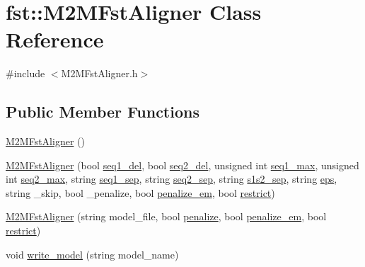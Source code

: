 \hypertarget{classfst_1_1_m2_m_fst_aligner}{}\section{fst\+:\+:M2\+M\+Fst\+Aligner Class Reference}
\label{classfst_1_1_m2_m_fst_aligner}


{\ttfamily \#include $<$M2\+M\+Fst\+Aligner.\+h$>$}

\subsection*{Public Member Functions}
\begin{DoxyCompactItemize}
\item 
\hyperlink{classfst_1_1_m2_m_fst_aligner_a914c39c27f3467848d3034a42d5d7fca}{M2\+M\+Fst\+Aligner} ()
\item 
\hyperlink{classfst_1_1_m2_m_fst_aligner_ae23113e5cae29dc94b32ed9579d55c25}{M2\+M\+Fst\+Aligner} (bool \hyperlink{classfst_1_1_m2_m_fst_aligner_a1ea4cfa480a906720412d89e3cbdf78f}{seq1\+\_\+del}, bool \hyperlink{classfst_1_1_m2_m_fst_aligner_a5aaa4b5b87e92d8060aa23f28e9219e6}{seq2\+\_\+del}, unsigned int \hyperlink{classfst_1_1_m2_m_fst_aligner_ab83262d3fb217a148435777d28dcf3bd}{seq1\+\_\+max}, unsigned int \hyperlink{classfst_1_1_m2_m_fst_aligner_a5317b10db862b4f09b34e71b253b24c6}{seq2\+\_\+max}, string \hyperlink{classfst_1_1_m2_m_fst_aligner_a03ce5ddbcc042ece93dc2ac0dde9935d}{seq1\+\_\+sep}, string \hyperlink{classfst_1_1_m2_m_fst_aligner_a959c82581fc3a8a2a5999cc4daee123d}{seq2\+\_\+sep}, string \hyperlink{classfst_1_1_m2_m_fst_aligner_ae495dc0a0762485ad6b797bfe656cf53}{s1s2\+\_\+sep}, string \hyperlink{classfst_1_1_m2_m_fst_aligner_accef9f2dfd2f0c5a91ccf7c796d832cf}{eps}, string \+\_\+skip, bool \+\_\+penalize, bool \hyperlink{classfst_1_1_m2_m_fst_aligner_ae2218632c2af9b8b788d36bebb7db9b7}{penalize\+\_\+em}, bool \hyperlink{classfst_1_1_m2_m_fst_aligner_a11bb481204d03c4019f3fc0644da9320}{restrict})
\item 
\hyperlink{classfst_1_1_m2_m_fst_aligner_a013e0f95a5b4e92db0824dc96bf63b1c}{M2\+M\+Fst\+Aligner} (string model\+\_\+file, bool \hyperlink{classfst_1_1_m2_m_fst_aligner_a6bf185403bdfc4bb5302235ba06f196b}{penalize}, bool \hyperlink{classfst_1_1_m2_m_fst_aligner_ae2218632c2af9b8b788d36bebb7db9b7}{penalize\+\_\+em}, bool \hyperlink{classfst_1_1_m2_m_fst_aligner_a11bb481204d03c4019f3fc0644da9320}{restrict})
\item 
void \hyperlink{classfst_1_1_m2_m_fst_aligner_a9da148c5847ae7e41ae46bd80f5ffb5d}{write\+\_\+model} (string model\+\_\+name)

\end{DoxyCompactItemize}
